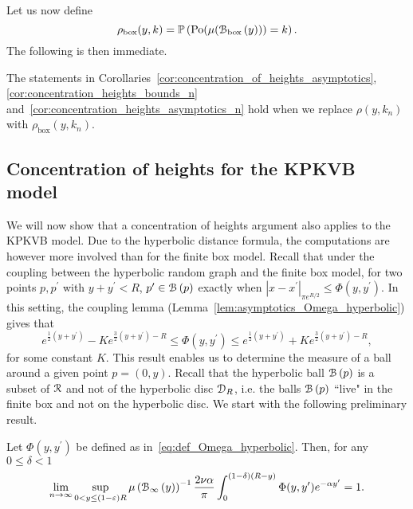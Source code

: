 Let us now define
\[
	\rho_{\mathrm{box}}(y,k) = \mathbb{P}\left({\mathrm{Po}}(\mu({\mathcal B}_{\text{box}}\left(y\right))) = k\right).
\]
The following is then immediate.


\begin{corollary}\label{cor:concentration_of_heights_Gbox}
The statements in Corollaries~\ref{cor:concentration_of_heights_asymptotics}, \ref{cor:concentration_heights_bounds_n}
and~\ref{cor:concentration_heights_asymptotics_n} hold when we replace $\rho(y,k_n)$ with $\rho_{\text{box}}(y,k_n)$.
\end{corollary}

\subsection{Concentration of heights for the KPKVB model}\label{ssec:average_degree_HP_n}


We will now show that a concentration of heights argument also applies to the KPKVB model. Due to the hyperbolic distance formula, the computations are however more involved than for the finite box model. Recall that under the coupling between the hyperbolic random graph and the finite box model, for two points $p, p^\prime$ with $y + y^\prime < R$, $p^\prime \in {\mathcal B}\left(p\right)$ exactly when $|x-x^\prime|_{\pi e^{R/2}} \le \Phi(y,y^\prime)$. In this setting, the coupling lemma (Lemma~\ref{lem:asymptotics_Omega_hyperbolic}) gives that  
\[
	e^{\frac{1}{2}(y+y^\prime)} - K e^{\frac{3}{2}(y+y^\prime) - R} \leq \Phi(y, y^\prime) 
		\leq  e^{\frac{1}{2}(y+y^\prime)} + K e^{\frac{3}{2}(y+y^\prime) - R},
\]
for some constant $K$. This result enables us to determine the measure of a ball around a given point $p=(0,y)$. Recall that the hyperbolic ball ${\mathcal B}\left(p\right)$ is a subset of ${\mathcal R}$ and not of the hyperbolic disc ${\mathcal D}_{R}$, i.e. the balls ${\mathcal B}\left(p\right)$ ``live" in the finite box and not on the hyperbolic disc. We start with the following preliminary result.

\begin{lemma}\label{lem:hyperbolic_ball_lower_part}
Let $\Phi(y,y^\prime)$ be defined as in~\eqref{eq:def_Omega_hyperbolic}. Then, for any $0 \le \delta < 1$
\[
	\lim_{n \to \infty} \sup_{0 < y \le (1-\varepsilon)R} \mu\left({\mathcal B}_{\infty}\left(y\right)\right)^{-1} \frac{2\nu \alpha}{\pi} \int_0^{(1-\delta)(R-y)} \Phi(y,y^\prime) e^{-\alpha y^\prime} = 1.
\]
\end{lemma}

